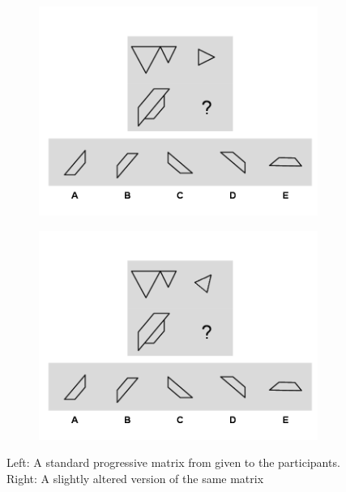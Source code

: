 \begin{figure}[H]
  \centering
  \begin{subfigure}[t]{0.4\textwidth}
    \includegraphics[width=\textwidth]{img/q-17.png}
    \label{fig:figureMatrixStandard}
  \end{subfigure}
  \hspace{5mm}
  \begin{subfigure}[t]{0.4\textwidth}
    \includegraphics[width=\textwidth]{img/q-57.png}
    \label{fig:figureMatrixAltered}
  \end{subfigure}
  \caption{Left: A standard progressive matrix from \textcite{albuquerqueDoesGenderStereotype2017} given to the participants. Right: A slightly altered version of the same matrix}
  \label{fig:figureMatrices}
\end{figure}

